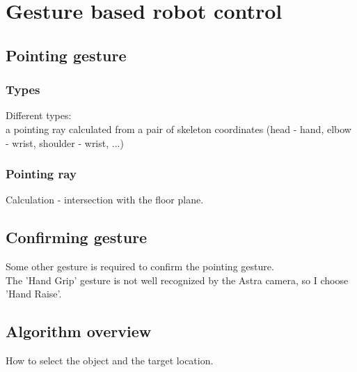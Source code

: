 \chapter{Gesture based robot control}

\section{Pointing gesture}

\subsection{Types}
Different types: \\
a pointing ray calculated from a pair of skeleton coordinates (head - hand, elbow - wrist, shoulder - wrist, ...)\\

\subsection{Pointing ray}
Calculation - intersection with the floor plane. \\

\section{Confirming gesture}
Some other gesture is required to confirm the pointing gesture. \\
The 'Hand Grip' gesture is not well recognized by the Astra camera, so I choose 'Hand Raise'.\\

\section{Algorithm overview}
How to select the object and the target location.\\
